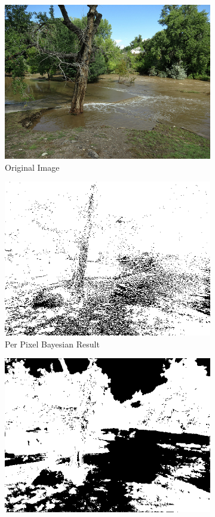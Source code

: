 \documentclass[12pt]{article}
\begin{document}
\begin{figure}
\begin{subfigure}{.33\textwidth}
  \centering
  \includegraphics[width=.9\linewidth]{./images/sourceImages/9780984764_7863c32b65.png}
  \caption{Original Image}
\end{subfigure}%
\begin{subfigure}{.33\textwidth}
  \centering
  \includegraphics[width=.9\linewidth]{./images/perPixelBayesianClassifierPrimaryResults/9780984764_7863c32b65.png}
  \caption{Per Pixel Bayesian Result}
\end{subfigure}%
\begin{subfigure}{.33\textwidth}
  \centering
  \includegraphics[width=.9\linewidth]{./images/NeuralNetworkClassifierpt339602PrimaryResults25NodeLayers/9780984764_7863c32b65.png}

\end{subfigure}
\end{figure}
\end{document}
